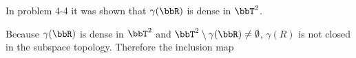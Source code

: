 In problem 4-4 it was shown that $\gamma(\bbR)$ is dense in $\bbT^2$.  

Because $\gamma(\bbR)$ is dense in $\bbT^2$ and $\bbT^2 \setminus \gamma(\bbR) \neq \emptyset$, $\gamma(R)$ is not closed in the subspace topology.  Therefore the inclusion map 